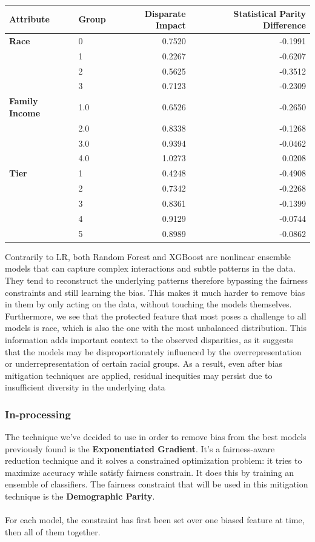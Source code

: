 \documentclass{article}
\begin{document}
\begin{center}
\begin{tabular}{llrr}
\toprule
\textbf{Attribute} & \textbf{Group} & \textbf{Disparate Impact} & \textbf{Statistical Parity Difference} \\
\midrule
\textbf{Race}
& 0 & 0.7520 & -0.1991 \\
& 1 & 0.2267 & -0.6207 \\
& 2 & 0.5625 & -0.3512 \\
& 3 & 0.7123 & -0.2309 \\
\midrule
\textbf{Family Income}
& 1.0 & 0.6526 & -0.2650 \\
& 2.0 & 0.8338 & -0.1268 \\
& 3.0 & 0.9394 & -0.0462 \\
& 4.0 & 1.0273 & 0.0208 \\
\midrule
\textbf{Tier}
& 1 & 0.4248 & -0.4908 \\
& 2 & 0.7342 & -0.2268 \\
& 3 & 0.8361 & -0.1399 \\
& 4 & 0.9129 & -0.0744 \\
& 5 & 0.8989 & -0.0862 \\
\bottomrule
\end{tabular}
\end{center}


Contrarily to LR, both Random Forest and XGBoost are nonlinear ensemble models that can capture complex interactions and subtle patterns in the data. They tend to reconstruct the underlying patterns therefore bypassing the fairness constraints and still learning the bias. This makes it much harder to remove bias in them by only acting on the data, without touching the models themselves. Furthermore, we see that the protected feature that most poses a challenge to all models is race, which is also the one with the most unbalanced distribution. This information adds important context to the observed disparities, as it suggests that the models may be disproportionately influenced by the overrepresentation or underrepresentation of certain racial groups. As a result, even after bias mitigation techniques are applied, residual inequities may persist due to insufficient diversity in the underlying data



\subsubsection{In-processing}
The technique we've decided to use in order to remove bias from the best models previously found is the \textbf{Exponentiated Gradient}. It's a fairness-aware reduction technique and it solves a constrained optimization problem: it tries to maximize accuracy while satisfy fairness constrain. It does this by training an ensemble of classifiers. The fairness constraint that will be used in this mitigation technique is the \textbf{Demographic Parity}.\\ \\
For each model, the constraint has first been set over one biased feature at time, then all of them together.
\end{document}
